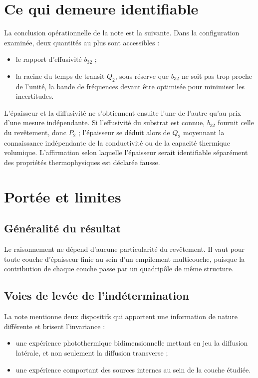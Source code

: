 \documentclass[11pt,a4paper]{article}
\begin{document}
\section{Ce qui demeure identifiable}

La conclusion opérationnelle de la note est la suivante. Dans la configuration examinée, deux quantités
au plus sont accessibles :

\begin{itemize}
\item le rapport d'effusivité $b_{32}$ ;
\item la racine du temps de transit $Q_{2}$, sous réserve que $b_{32}$ ne soit pas trop proche de
l'unité, la bande de fréquences devant être optimisée pour minimiser les incertitudes.
\end{itemize}

L'épaisseur et la diffusivité ne s'obtiennent ensuite l'une de l'autre qu'au prix d'une mesure
indépendante. Si l'effusivité du substrat est connue, $b_{32}$ fournit celle du revêtement, donc $P_{2}$ ;
l'épaisseur se déduit alors de $Q_{2}$ moyennant la connaissance indépendante de la conductivité ou de
la capacité thermique volumique. L'affirmation selon laquelle l'épaisseur serait identifiable
séparément des propriétés thermophysiques est déclarée fausse.

\section{Portée et limites}

\subsection{Généralité du résultat}

Le raisonnement ne dépend d'aucune particularité du revêtement. Il vaut pour toute couche d'épaisseur
finie au sein d'un empilement multicouche, puisque la contribution de chaque couche passe par un
quadripôle de même structure.

\subsection{Voies de levée de l'indétermination}

La note mentionne deux dispositifs qui apportent une information de nature différente et brisent
l'invariance :

\begin{itemize}
\item une expérience photothermique bidimensionnelle mettant en jeu la diffusion latérale, et non
seulement la diffusion transverse ;
\item une expérience comportant des sources internes au sein de la couche étudiée.
\end{itemize}
\end{document}
